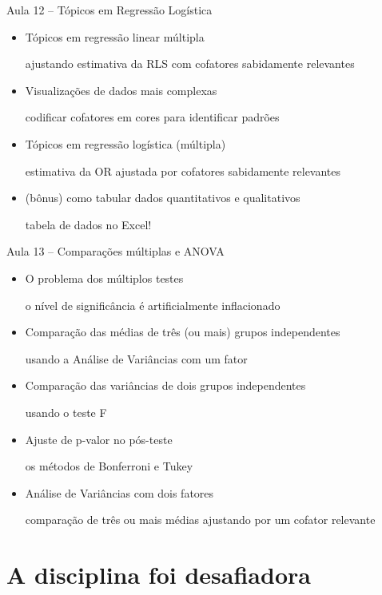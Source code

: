 \documentclass{beamer}
\begin{document}
\begin{frame}{\scriptsize Aula 12 -- Tópicos em Regressão Logística}
  \begin{itemize}
    \footnotesize
  \item Tópicos em regressão linear múltipla

    {\tiny ajustando estimativa da RLS com cofatores sabidamente relevantes}
    \bigskip
  \item Visualizações de dados mais complexas

    {\tiny codificar cofatores em cores para identificar padrões}
    \bigskip
  \item Tópicos em regressão logística (múltipla)

    {\tiny estimativa da OR ajustada por cofatores sabidamente relevantes}
    \bigskip
  \item (bônus) como tabular dados quantitativos e qualitativos

    {\tiny tabela de dados no Excel!}
  \end{itemize}
\end{frame}

\begin{frame}{\scriptsize Aula 13 -- Comparações múltiplas e ANOVA}
  \begin{itemize}
    \footnotesize
  \item O problema dos múltiplos testes

    {\tiny o nível de significância é artificialmente inflacionado}
    \bigskip
  \item Comparação das médias de três (ou mais) grupos independentes

    {\tiny usando a Análise de Variâncias com um fator}
    \bigskip
  \item Comparação das variâncias de dois grupos independentes

    {\tiny usando o teste F}
    \bigskip
  \item Ajuste de p-valor no pós-teste

    {\tiny os métodos de Bonferroni e Tukey}
    \bigskip
  \item Análise de Variâncias com dois fatores

    {\tiny comparação de três ou mais médias ajustando por um cofator relevante}
  \end{itemize}
\end{frame}

\section{A disciplina foi desafiadora}
\end{document}
